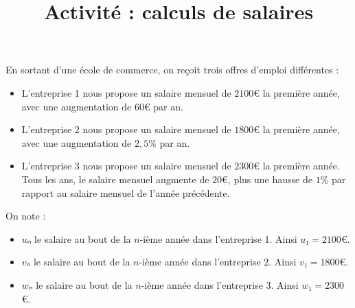 \documentclass[
	classe=$1^{ere}STI2D$
]{exercice}
\title{Activité : calculs de salaires}
\begin{document}
\maketitle

En sortant d'une école de commerce, on reçoit trois offres d'emploi différentes :
\begin{itemize}
	\item L'entreprise 1 nous propose un salaire mensuel de $2100$€ la première année, avec une augmentation de $60$€ par an.
	\item L'entreprise 2 nous propose un salaire mensuel de $1800$€ la première année, avec une augmentation de $2,5$\% par an.
	\item L'entreprise 3 nous propose un salaire mensuel de $2300$€ la première année. Tous les ans, le salaire mensuel augmente de $20$€, plus une hausse de $1$\% par rapport au salaire mensuel de l'année précédente.
\end{itemize}

On note :
\begin{itemize}
	\item $uₙ$ le salaire au bout de la $n$-ième année dans l'entreprise 1. Ainsi $u₁ = 2100$€.
	\item $vₙ$ le salaire au bout de la $n$-ième année dans l'entreprise 2. Ainsi $v₁ = 1800$€.
	\item $wₙ$ le salaire au bout de la $n$-ième année dans l'entreprise 3. Ainsi $w₁ = 2300$€.
\end{itemize}
\end{document}
